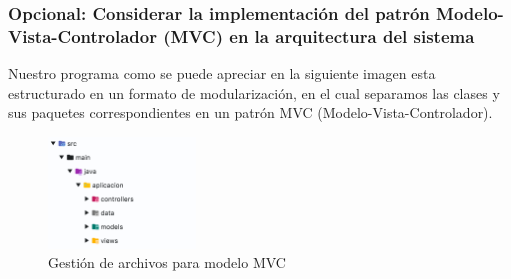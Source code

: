 \subsubsection*{Opcional: Considerar la implementación del patrón Modelo-Vista-Controlador (MVC) en la arquitectura del sistema}

Nuestro programa como se puede apreciar en la siguiente imagen  esta estructurado en un formato de modularización, en el cual separamos las clases y sus paquetes correspondientes  en un patrón MVC (Modelo-Vista-Controlador).

\begin{figure}[h]
    \centering
    \includegraphics[width=0.35\textwidth]{contents/img/img14}
    \caption{Gestión de archivos para modelo MVC}
    \label{fig:img14}
\end{figure}

